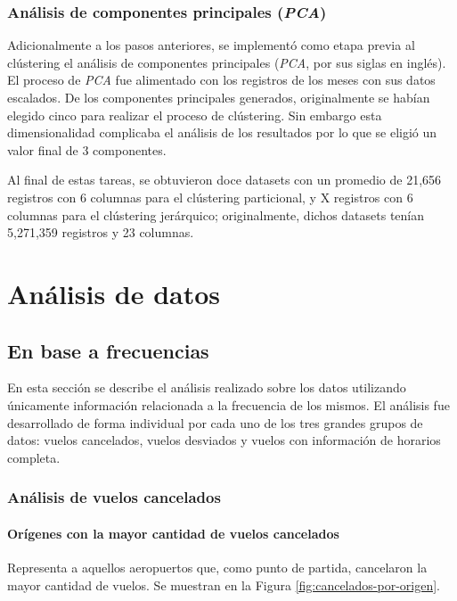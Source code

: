 \documentclass[12pt]{article}
\numberwithin{equation}{section}
\numberwithin{table}{section}
\numberwithin{figure}{section}
\begin{document}
\subsubsection{Análisis de componentes principales (\emph{PCA})}
Adicionalmente a los pasos anteriores, se implementó como etapa previa al clústering el análisis de componentes principales (\emph{PCA}, por sus siglas en inglés).
El proceso de \emph{PCA} fue alimentado con los registros de los meses con sus datos escalados. 
De los componentes principales generados, originalmente se habían elegido cinco para realizar el proceso de clústering. 
Sin embargo esta dimensionalidad complicaba el análisis de los resultados por lo que se eligió un valor final de 3 componentes.

Al final de estas tareas, se obtuvieron doce datasets con un promedio de 21,656 registros con 6 columnas para el clústering particional, y X registros con 6 columnas para el clústering jerárquico; originalmente, dichos datasets tenían 5,271,359 registros y 23 columnas.

\section{Análisis de datos}
\subsection{En base a frecuencias}
En esta sección se describe el análisis realizado sobre los datos utilizando únicamente información relacionada a la frecuencia de los mismos.
El análisis fue desarrollado de forma individual por cada uno de los tres grandes grupos de datos: vuelos cancelados, vuelos desviados y vuelos con información de horarios completa.

\subsubsection{Análisis de vuelos cancelados}
\paragraph{Orígenes con la mayor cantidad de vuelos cancelados}
Representa a aquellos aeropuertos que, como punto de partida, cancelaron la mayor cantidad de vuelos. Se muestran en la Figura \ref{fig:cancelados-por-origen}.
\end{document}
